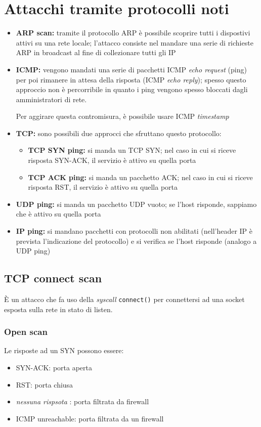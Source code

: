 \section{Attacchi tramite protocolli noti}
\begin{itemize}
    \item \textbf{ARP scan:} tramite il protocollo ARP è possibile scoprire tutti i dispostivi 
    attivi su una rete locale; l'attacco consiste nel mandare una serie di richieste ARP in broadcast al fine 
    di collezionare tutti gli IP 
    \item \textbf{ICMP:} vengono mandati una serie di pacchetti ICMP \textit{echo request} (ping) per 
    poi rimanere in attesa della risposta (ICMP \textit{echo reply}); spesso questo approccio non è percorribile 
    in quanto i ping vengono spesso bloccati dagli amministratori di rete.

    \noindent Per aggirare questa contromisura, è possibile usare ICMP \textit{timestamp}
    \newpage
    \item \textbf{TCP:} sono possibili due approcci che sfruttano questo protocollo:
    \begin{itemize}
        \item \textbf{TCP SYN ping:} si manda un TCP SYN; nel caso in cui si riceve risposta SYN-ACK, 
        il servizio è attivo su quella porta 
        \item \textbf{TCP ACK ping:} si manda un pacchetto ACK; nel caso in cui si riceve risposta 
        RST, il servizio è attivo su quella porta 
    \end{itemize}
    \item \textbf{UDP ping:} si manda un pacchetto UDP vuoto; se l'host risponde, sappiamo che è attivo 
    su quella porta 
    \item \textbf{IP ping:} si mandano pacchetti con protocolli non abilitati (nell'header IP è prevista l'indicazione del protocollo) e 
    si verifica se l'host risponde (analogo a UDP ping)
\end{itemize}

\subsection{TCP connect scan}
È un attacco che fa uso della \textit{syscall} \texttt{connect()} per connettersi ad una 
socket esposta sulla rete in stato di listen.

\subsubsection{Open scan}
Le risposte ad un SYN possono essere:
\begin{itemize}
    \item SYN-ACK: porta aperta 
    \item RST: porta chiusa 
    \item \textit{nessuna rispsota} : porta filtrata da firewall
    \item ICMP unreachable: porta filtrata da un firewall
\end{itemize}


